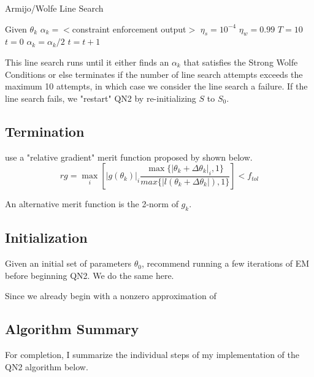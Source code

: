 \documentclass[letter,12pt]{article}
\begin{document}
\begin{algorithm} 
\caption{Armijo/Wolfe Line Search}
\label{armijo_wolfe}
\begin{algorithmic}[1]
\State Given $\theta_k$
\State $\alpha_k = <$constraint enforcement output$>$
\State $\eta_s = 10^{-4}$
\State $\eta_w = 0.99$
\State $T = 10$
\State $t = 0$
\State $\alpha_k = \alpha_k / 2$
\State $t = t + 1$
\EndWhile
\end{algorithmic}
\end{algorithm}

This line search runs until it either finds an $\alpha_k$ that satisfies the Strong Wolfe Conditions or else terminates if the number of line search attempts exceeds the maximum 10 attempts, in which case we consider the line search a failure.  If the line search fails, we "restart" QN2 by re-initializing $S$ to $S_0$.

\subsection{Termination}

\cite{jamshidianj97} use a "relative gradient" merit function proposed by \cite{khalfan93} shown below.
\begin{equation}
rg = \max_i
\left[
|g(\theta_k)|_i
\frac
{\max\{|\theta_k + \Delta \theta_k|_i,1\}}
{max\{|l(\theta_k + \Delta \theta_k|),1\}}
\right]
< f_{tol}
\end{equation}

An alternative merit function is the 2-norm of $g_k$.

\subsection{Initialization}

Given an initial set of parameters $\theta_0$, \cite{jamshidianj93} recommend running a few iterations of EM before beginning QN2.  We do the same here.

Since we already begin with a nonzero approximation of 

\subsection{Algorithm Summary}

For completion, I summarize the individual steps of my implementation of the QN2 algorithm below.
\end{document}
